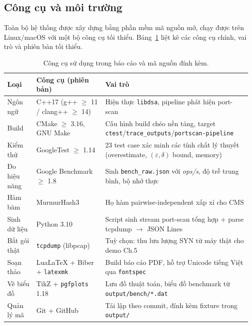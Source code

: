 \subsection{Công cụ và môi trường}
\label{sec:tools}

Toàn bộ hệ thống được xây dựng bằng phần mềm mã nguồn mở, chạy được trên Linux/macOS với một bộ công cụ tối thiểu. Bảng~\ref{tab:tools} liệt kê các công cụ chính, vai trò và phiên bản tối thiểu.

\begin{table}[H]
  \centering
  \caption{Công cụ sử dụng trong báo cáo và mã nguồn đính kèm.}
  \label{tab:tools}
  \small
  \begin{tabularx}{\linewidth}{@{}l l X@{}}
    \toprule
    \textbf{Loại} & \textbf{Công cụ (phiên bản)} & \textbf{Vai trò} \\
    \midrule
    Ngôn ngữ        & C++17 (g++ $\ge$ 11 / clang++ $\ge$ 14) & Hiện thực \texttt{libdsa}, pipeline phát hiện port-scan \\
    Build           & CMake $\ge$ 3.16, GNU Make            & Cấu hình build chéo nền tảng, target \texttt{ctest}/\texttt{trace\_outputs}/\texttt{portscan-pipeline} \\
    Kiểm thử        & GoogleTest $\ge$ 1.14                  & 23 test case xác minh các tính chất lý thuyết (overestimate, $(\varepsilon,\delta)$ bound, memory) \\
    Đo hiệu năng    & Google Benchmark $\ge$ 1.8             & Sinh \texttt{bench\_raw.json} với \textit{ops/s}, độ trễ trung bình, bộ nhớ thực \\
    Hàm băm         & MurmurHash3 \cite{appleby2011murmur}   & Họ hàm pairwise-independent xấp xỉ cho CMS \\
    Sinh dữ liệu    & Python 3.10                            & Script sinh stream port-scan tổng hợp + parse tcpdump $\rightarrow$ JSON Lines \\
    Bắt gói thật    & \texttt{tcpdump} (libpcap)             & Tuỳ chọn: thu lưu lượng SYN từ máy thật cho demo Ch.5 \\
    Soạn thảo       & LuaLaTeX + Biber + \texttt{latexmk}    & Build báo cáo PDF, hỗ trợ Unicode tiếng Việt qua \texttt{fontspec} \\
    Vẽ biểu đồ      & TikZ + \texttt{pgfplots} 1.18          & Lưu đồ thuật toán, biểu đồ benchmark từ \texttt{output/bench/*.dat} \\
    Quản lý mã      & Git + GitHub                            & Tái lập theo commit, đính kèm fixture trong \texttt{output/} \\
    \bottomrule
  \end{tabularx}
\end{table}

